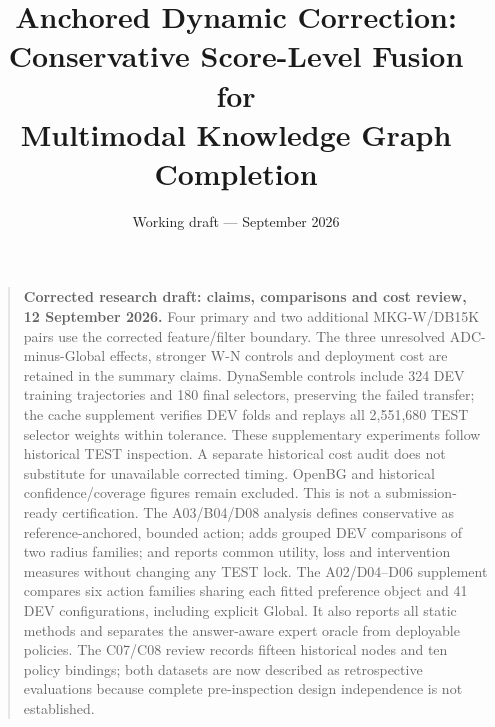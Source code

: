 \documentclass[11pt,a4paper]{article}
\title{Anchored Dynamic Correction:\\Conservative Score-Level Fusion for\\Multimodal Knowledge Graph Completion}
\author{}
\date{Working draft --- September 2026}
\begin{document}
\maketitle
\begin{quote}
\textbf{Corrected research draft: claims, comparisons and cost review, 12 September 2026.}
Four primary and two additional MKG-W/DB15K pairs use the corrected feature/filter boundary. The three unresolved ADC-minus-Global effects, stronger W-N controls and deployment cost are retained in the summary claims. DynaSemble controls include 324 DEV training trajectories and 180 final selectors, preserving the failed transfer; the cache supplement verifies DEV folds and replays all 2,551,680 TEST selector weights within tolerance. These supplementary experiments follow historical TEST inspection. A separate historical cost audit does not substitute for unavailable corrected timing. OpenBG and historical confidence/coverage figures remain excluded. This is not a submission-ready certification.
The A03/B04/D08 analysis defines conservative as reference-anchored, bounded action; adds grouped DEV comparisons of two radius families; and reports common utility, loss and intervention measures without changing any TEST lock.
The A02/D04--D06 supplement compares six action families sharing each fitted preference object and 41 DEV configurations, including explicit Global. It also reports all static methods and separates the answer-aware expert oracle from deployable policies. The C07/C08 review records fifteen historical nodes and ten policy bindings; both datasets are now described as retrospective evaluations because complete pre-inspection design independence is not established.
\end{quote}
\end{document}
